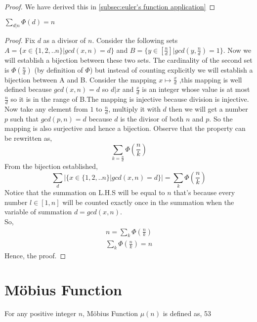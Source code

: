 \begin{proof}
We have derived this in \ref{subsec:euler's function application}
\end{proof}
                
\begin{property}
$ \sum_{d|n}^{} \Phi(d) = n $
\end{property}

\begin{proof}
Fix $d$ as a divisor of $n$. Consider the following sets $ A = \{x\in\{1,2,..n\} | gcd(x,n)=d\}$ and $B = \{y\in [\frac{n}{d}] | gcd(y,\frac{n}{d})=1\}$. Now we will establish a bijection between these two sets. The cardinality of the second set is $\Phi(\frac{n}{d})$ (by definition of $\Phi$) but instead of counting explicitly we will establish a bijection between A and B. Consider the mapping $x \mapsto \frac{x}{d}$ ,this mapping is well defined because $gcd(x,n) = d$ so $d|x$ and $\frac{x}{d}$ is an integer whose value is at most $\frac{n}{d}$ so it is in the range of B.The mapping is injective because division is injective. Now take any element from $1$ to $\frac{n}{d}$, multiply it with $d$ then we will get a number $p$ such that $gcd(p,n) = d$ because $d$ is the divisor of both $n$ and $p$. So the mapping is also surjective and hence a bijection. 
Observe that the property can be rewritten as, 
$$
\sum_{k = \frac{n}{d}}\Phi(\frac{n}{k})
$$ 
From the bijection established,$$
\sum_{d}|\{x\in\{1,2,..n\}|gcd(x,n)=d\}| = \sum_{k}\Phi(\frac{n}{k})
$$
Notice that the summation on L.H.S will be equal to $n$ that's because every number $l \in [1,n]$ will be counted exactly once in the summation when the variable of summation $d=gcd(x,n)$.\\
So, 
\begin{align*}
n =  \sum_{k}\Phi(\frac{n}{k})\\
\sum_{k}\Phi(\frac{n}{k}) = n
\end{align*}
Hence, the proof.
\end{proof} 

\section{Möbius Function} \label{sec:Möbius Function}
For any positive integer $n$, Möbius Function $\mu(n)$ is defined as, 
53
 
